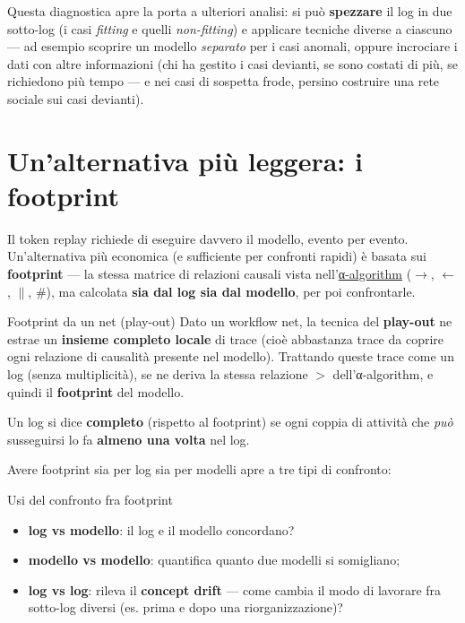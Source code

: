 Questa diagnostica apre la porta a ulteriori analisi: si può \textbf{spezzare} il log in due sotto-log (i casi \emph{fitting} e quelli \emph{non-fitting}) e applicare tecniche diverse a ciascuno — ad esempio scoprire un modello \emph{separato} per i casi anomali, oppure incrociare i dati con altre informazioni (chi ha gestito i casi devianti, se sono costati di più, se richiedono più tempo — e nei casi di sospetta frode, persino costruire una rete sociale sui casi devianti).

\section{\texorpdfstring{Un'alternativa più leggera: i footprint}{Un'alternativa più leggera: i footprint}}

Il token replay richiede di eseguire davvero il modello, evento per evento. Un'alternativa più economica (e sufficiente per confronti rapidi) è basata sui \textbf{footprint} — la stessa matrice di relazioni causali vista nell'\hyperref[ch:05]{α-algorithm} ($\to$, $\leftarrow$, $\parallel$, $\#$), ma calcolata \textbf{sia dal log sia dal modello}, per poi confrontarle.

\begin{boxdefinition}{Footprint da un net (play-out)}
Dato un workflow net, la tecnica del \textbf{play-out} ne estrae un \textbf{insieme completo locale} di trace (cioè abbastanza trace da coprire ogni relazione di causalità presente nel modello). Trattando queste trace come un log (senza multiplicità), se ne deriva la stessa relazione $>$ dell'α-algorithm, e quindi il \textbf{footprint} del modello.

Un log si dice \textbf{completo} (rispetto al footprint) se ogni coppia di attività che \emph{può} susseguirsi lo fa \textbf{almeno una volta} nel log.
\end{boxdefinition}

Avere footprint sia per log sia per modelli apre a tre tipi di confronto:

\begin{boxnote}{Usi del confronto fra footprint}
\begin{itemize}
\item \textbf{log vs modello}: il log e il modello concordano?
\item \textbf{modello vs modello}: quantifica quanto due modelli si somigliano;
\item \textbf{log vs log}: rileva il \textbf{concept drift} — come cambia il modo di lavorare fra sotto-log diversi (es. prima e dopo una riorganizzazione)?
\end{itemize}
\end{boxnote}

